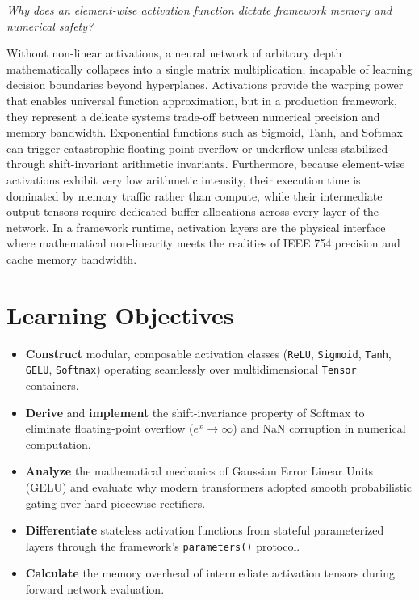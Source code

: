 \documentclass[
  letterpaper,
]{scrbook}
\providecommand{\tightlist}{%
  \setlength{\itemsep}{0pt}\setlength{\parskip}{0pt}}
\begin{document}

\emph{Why does an element-wise activation function dictate framework
memory and numerical safety?}

Without non-linear activations, a neural network of arbitrary depth
mathematically collapses into a single matrix multiplication, incapable
of learning decision boundaries beyond hyperplanes. Activations provide
the warping power that enables universal function approximation, but in
a production framework, they represent a delicate systems trade-off
between numerical precision and memory bandwidth. Exponential functions
such as Sigmoid, Tanh, and Softmax can trigger catastrophic
floating-point overflow or underflow unless stabilized through
shift-invariant arithmetic invariants. Furthermore, because element-wise
activations exhibit very low arithmetic intensity, their execution time
is dominated by memory traffic rather than compute, while their
intermediate output tensors require dedicated buffer allocations across
every layer of the network. In a framework runtime, activation layers
are the physical interface where mathematical non-linearity meets the
realities of IEEE 754 precision and cache memory bandwidth.

\section{Learning Objectives}\label{learning-objectives-2}

\begin{itemize}
\tightlist
\item
  \textbf{Construct} modular, composable activation classes
  (\texttt{ReLU}, \texttt{Sigmoid}, \texttt{Tanh}, \texttt{GELU},
  \texttt{Softmax}) operating seamlessly over multidimensional
  \texttt{Tensor} containers.
\item
  \textbf{Derive} and \textbf{implement} the shift-invariance property
  of Softmax to eliminate floating-point overflow (\(e^x \to \infty\))
  and NaN corruption in numerical computation.
\item
  \textbf{Analyze} the mathematical mechanics of Gaussian Error Linear
  Units (GELU) and evaluate why modern transformers adopted smooth
  probabilistic gating over hard piecewise rectifiers.
\item
  \textbf{Differentiate} stateless activation functions from stateful
  parameterized layers through the framework's \texttt{parameters()}
  protocol.
\item
  \textbf{Calculate} the memory overhead of intermediate activation
  tensors during forward network evaluation.
\end{itemize}
\end{document}
